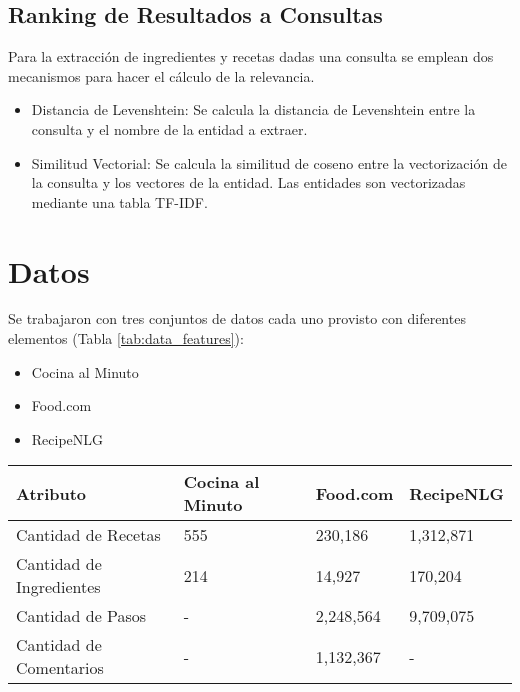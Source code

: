 \documentclass[
	a4paper, %
	10pt, %
	unnumberedsections, %
	twoside, %
]{LTJournalArticle}
\begin{document}
\subsection{Ranking de Resultados a Consultas}
\label{subsec:rank_query}

Para la extracción de ingredientes y recetas dadas una consulta se emplean dos mecanismos para hacer el cálculo
de la relevancia.

\begin{itemize}
	\item Distancia de Levenshtein: Se calcula la distancia de Levenshtein entre la consulta y el nombre de la 
	entidad a extraer.
	\item Similitud Vectorial: Se calcula la similitud de coseno entre la vectorización de la consulta y los
	vectores de la entidad. Las entidades son vectorizadas mediante una tabla TF-IDF. 
\end{itemize}

\section{Datos}

Se trabajaron con tres conjuntos de datos cada uno provisto con diferentes elementos (Tabla \ref{tab:data_features}):

\begin{itemize}
	\item Cocina al Minuto
	\item Food.com \autocite{majumder2019generating}
	\item RecipeNLG \autocite{bien-etal-2020-recipenlg}
\end{itemize}

\begin{table*} %
	\caption{Atributos de los conjuntos de datos.}
	\centering
	\begin{tabular}{l l l l}
		\toprule
		Atributo 				 & Cocina al Minuto & Food.com & RecipeNLG  \\
		\midrule
		Cantidad de Recetas 	 & 555				& 230,186	& 1,312,871	\\
		Cantidad de Ingredientes & 214	 			& 14,927	& 170,204	\\
		Cantidad de Pasos 		 & -	 			& 2,248,564	& 9,709,075	\\
		Cantidad de Comentarios  & -	 			& 1,132,367	& -			\\
		\bottomrule
	\end{tabular}
	\label{tab:data_features}
\end{table*}
\end{document}
